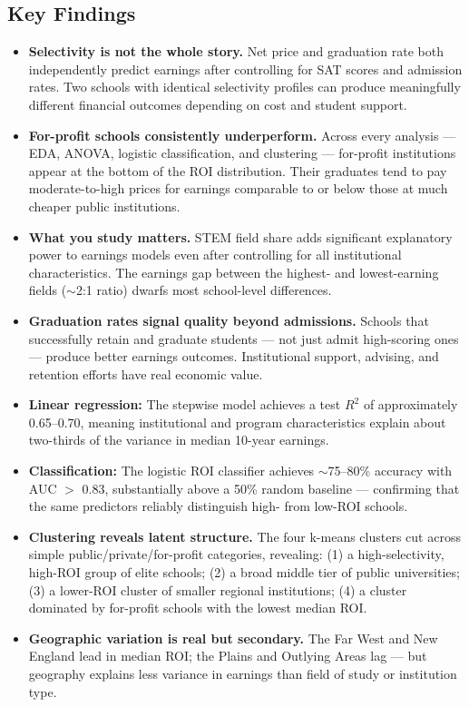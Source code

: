 \documentclass[12pt, letterpaper]{article}
\begin{document}
\subsection{Key Findings}

\begin{itemize}
  \item \textbf{Selectivity is not the whole story.} Net price and graduation rate both independently predict earnings after controlling for SAT scores and admission rates. Two schools with identical selectivity profiles can produce meaningfully different financial outcomes depending on cost and student support.

  \item \textbf{For-profit schools consistently underperform.} Across every analysis — EDA, ANOVA, logistic classification, and clustering — for-profit institutions appear at the bottom of the ROI distribution. Their graduates tend to pay moderate-to-high prices for earnings comparable to or below those at much cheaper public institutions.

  \item \textbf{What you study matters.} STEM field share adds significant explanatory power to earnings models even after controlling for all institutional characteristics. The earnings gap between the highest- and lowest-earning fields ($\sim$2:1 ratio) dwarfs most school-level differences.

  \item \textbf{Graduation rates signal quality beyond admissions.} Schools that successfully retain and graduate students — not just admit high-scoring ones — produce better earnings outcomes. Institutional support, advising, and retention efforts have real economic value.

  \item \textbf{Linear regression:} The stepwise model achieves a test $R^2$ of approximately 0.65–0.70, meaning institutional and program characteristics explain about two-thirds of the variance in median 10-year earnings.

  \item \textbf{Classification:} The logistic ROI classifier achieves $\sim$75–80\% accuracy with AUC $>$ 0.83, substantially above a 50\% random baseline — confirming that the same predictors reliably distinguish high- from low-ROI schools.

  \item \textbf{Clustering reveals latent structure.} The four k-means clusters cut across simple public/private/for-profit categories, revealing: (1) a high-selectivity, high-ROI group of elite schools; (2) a broad middle tier of public universities; (3) a lower-ROI cluster of smaller regional institutions; (4) a cluster dominated by for-profit schools with the lowest median ROI.

  \item \textbf{Geographic variation is real but secondary.} The Far West and New England lead in median ROI; the Plains and Outlying Areas lag — but geography explains less variance in earnings than field of study or institution type.
\end{itemize}
\end{document}
